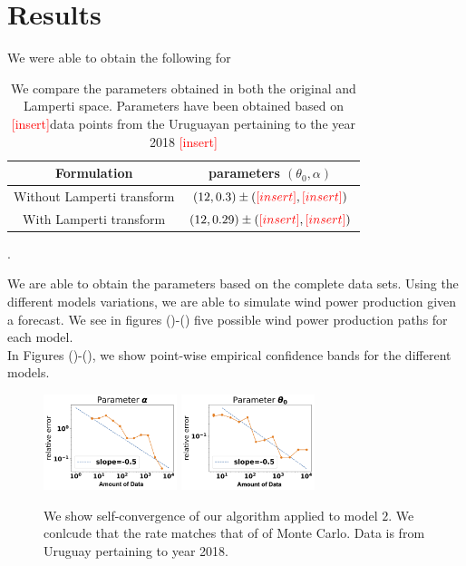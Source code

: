 \documentclass[10pt,twocolumn,letterpaper]{article}
\newcommand{\add}{\textcolor{red}{[insert]}}
\begin{document}
\section{Results} \label{Section_7}

We were able to obtain the following for 
\begin{table}[]
\centering
\begin{tabular}{|c|c|}
\hline
Formulation   &  parameters $(\theta_0, \alpha)$    \\ \hline
Without Lamperti transform &   $(12,0.3) \pm (\add , \add) $   \\ \hline
With Lamperti transform &   $(12,0.29) \pm (\add , \add)  $   \\ \hline
\end{tabular}
\caption{We compare the parameters obtained in both the original and Lamperti space. Parameters have been obtained based on \add data points from the Uruguayan pertaining to the year 2018  \add }.
\label{tab:model_comparison}
\end{table}

 We are able to obtain the parameters based on the complete data sets. Using the different models variations, we are able to simulate wind power production given a forecast. We see in figures ()-()
five possible wind power production paths for each model.\\

In Figures ()-(), we show point-wise empirical confidence bands for the different models.

\begin{figure}
  \includegraphics[width=39mm,scale=1]{plots/alpha_conv_beta.png}
  \includegraphics[width=39mm,scale=1]{plots/theta_conv_beta.png}
  \caption{We show self-convergence of our algorithm applied to model $2$. We conlcude that the rate  matches that of of Monte Carlo. Data is from Uruguay pertaining to  year 2018. }
\end{figure}
\end{document}
